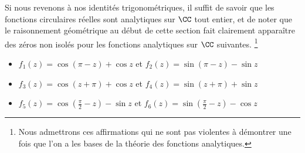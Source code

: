 Si nous revenons à nos identités trigonométriques, il suffit de savoir que les fonctions circulaires réelles sont analytiques sur $\CC$ tout entier, et de noter que le raisonnement géométrique au début de cette section fait clairement apparaître des zéros non isolés pour les fonctions analytiques sur $\CC$ suivantes.%
\footnote{
	Nous admettrons ces affirmations qui ne sont pas violentes à démontrer une fois que l'on a les bases de la théorie des fonctions analytiques.
}
%
\begin{itemize}[label=\small\textbullet]
	\item $f_1(z) = \cos (\pi - z) + \cos z$ 
	   et $f_2(z) = \sin (\pi - z) - \sin z$ 

	\smallskip
	\item $f_3(z) =\cos (z + \pi) + \cos z$ 
	   et $f_4(z) =\sin (z + \pi) + \sin z$

	\smallskip
	\item $f_5(z) =\cos \left( \frac{\pi}{2} - z \right) - \sin z$ 
	   et $f_6(z) =\sin \left( \frac{\pi}{2} - z \right) - \cos z$ 
\end{itemize}









